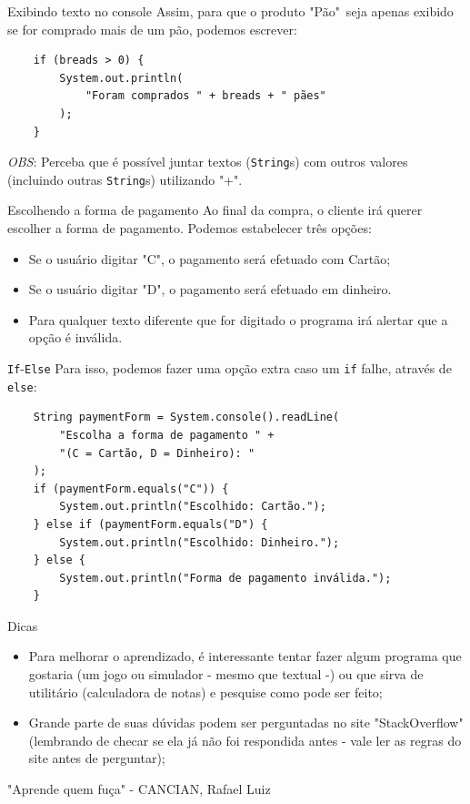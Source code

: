 \documentclass{beamer}
\begin{document}
\begin{frame}[fragile]{Exibindo texto no console}
    Assim, para que o produto "Pão"\ seja apenas exibido se for comprado mais
    de um pão, podemos escrever:

    \begin{verbatim}
    if (breads > 0) {
        System.out.println(
            "Foram comprados " + breads + " pães"
        );
    }
    \end{verbatim}

    \emph{OBS}: Perceba que é possível juntar textos (\texttt{String}s) com
    outros valores (incluindo outras \texttt{String}s) utilizando "+".
\end{frame}

\begin{frame}{Escolhendo a forma de pagamento}
    Ao final da compra, o cliente irá querer escolher a forma de pagamento.
    Podemos estabelecer três opções:

    \begin{itemize}
        \item Se o usuário digitar "C", o pagamento será efetuado com Cartão;
        \item Se o usuário digitar "D", o pagamento será efetuado em dinheiro.
        \item Para qualquer texto diferente que for digitado o programa irá
            alertar que a opção é inválida.
    \end{itemize}
\end{frame}

\begin{frame}[fragile]{\texttt{If}-\texttt{Else}}
    Para isso, podemos fazer uma opção extra caso um \texttt{if} falhe, através
    de \texttt{else}:

    \begin{verbatim}
    String paymentForm = System.console().readLine(
        "Escolha a forma de pagamento " +
        "(C = Cartão, D = Dinheiro): "
    );
    if (paymentForm.equals("C")) {
        System.out.println("Escolhido: Cartão.");
    } else if (paymentForm.equals("D") {
        System.out.println("Escolhido: Dinheiro.");
    } else {
        System.out.println("Forma de pagamento inválida.");
    }
    \end{verbatim}
\end{frame}

\begin{frame}{Dicas}
    \begin{itemize}
        \item Para melhorar o aprendizado, é interessante tentar fazer algum
            programa que gostaria (um jogo ou simulador - mesmo que textual -)
            ou que sirva de utilitário (calculadora de notas) e pesquise como
            pode ser feito;
        \item Grande parte de suas dúvidas podem ser perguntadas no site
            "StackOverflow" (lembrando de checar se ela já não foi respondida
            antes - vale ler as regras do site antes de perguntar);
    \end{itemize}

    \footnotesize "Aprende quem fuça" - CANCIAN, Rafael Luiz
\end{frame}
\end{document}
